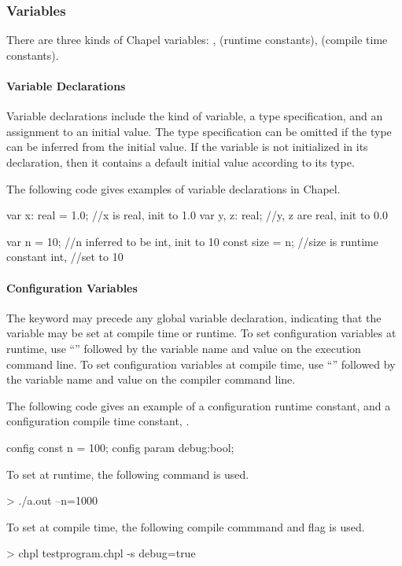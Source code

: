 \subsubsection{Variables}
There are three kinds of Chapel variables: ,
 (runtime constants),  (compile time constants).

\paragraph{Variable Declarations}
Variable declarations include the kind of variable, a type specification,
and an assignment to an initial value.  The type specification can be
omitted if the type can be inferred from the initial value.  If the
variable is not initialized in its declaration, then it contains a
default initial value according to its type.

\begin{example}
The following code gives examples of variable declarations in Chapel. 
\begin{chapel}
var x: real = 1.0; //x is real, init to 1.0
var y, z: real; //y, z are real, init to 0.0

var n = 10; //n inferred to be int, init to 10
const size = n; //size is runtime constant int,
                //set to 10
\end{chapel}
\end{example}

\paragraph{Configuration Variables}
The keyword  may precede any global variable
declaration, indicating that the variable may be set at
compile time or runtime.
To set configuration variables at runtime, use ``\chpl{--}''
followed by the variable name and value on the execution
command line.
To set configuration variables at compile time, use
``'' followed by the variable name and value on the
compiler command line.

\begin{example}
The following code gives an example of a configuration
runtime constant,  and a configuration compile time constant,
.
\begin{chapel}
config const n = 100;
config param debug:bool;
\end{chapel}

To set  at runtime, the following command is used.
\begin{commandline}
> ./a.out --n=1000
\end{commandline}

To set  at compile time, the following compile commmand
and flag is used.
\begin{commandline}
> chpl testprogram.chpl -s debug=true
\end{commandline}
\end{example}

